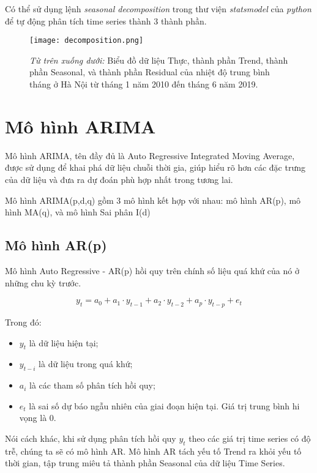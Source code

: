 \documentclass[12pt]{article}
\begin{document}
        Có thể sử dụng lệnh \textit{seasonal decomposition} trong thư viện \textit{statsmodel} của \textit{python} để tự động phân tích time series thành 3 thành phần.
        \begin{figure}[H]
            \centering
            \texttt{[image: decomposition.png]}
            \caption{\textit{Từ trên xuống dưới:} Biểu đồ dữ liệu Thực, thành phần Trend, thành phần Seasonal, và thành phần Residual của nhiệt độ trung bình tháng ở Hà Nội từ tháng 1 năm 2010 đến tháng 6 năm 2019.}
        \end{figure}

\section{Mô hình ARIMA}
Mô hình ARIMA, tên đầy đủ là Auto Regressive Integrated Moving Average, được sử dụng để khai phá dữ liệu chuỗi thời gia, giúp hiểu rõ hơn các đặc trưng của dữ liệu và đưa ra dự đoán phù hợp nhất trong tương lai.

Mô hình ARIMA(p,d,q) gồm 3 mô hình kết hợp với nhau: mô hình AR(p), mô hình MA(q), và mô hình Sai phân I(d)

    \subsection{Mô hình AR(p)}
    
    Mô hình Auto Regressive - AR(p) hồi quy trên chính số liệu quá khứ của nó ở những chu kỳ trước.
    
    $$
    y_t = a_0 + a_1 \cdot y_{t-1} + a_2 \cdot y_{t-2} + a_p \cdot y_{t-p} + e_t
    $$
    
    Trong đó:
    \begin{itemize}
        \item $y_t$ là dữ liệu hiện tại;
        \item $y_{t-i}$ là dữ liệu trong quá khứ;
        \item $a_i$ là các tham số phân tích hồi quy;
        \item $e_t$ là sai số dự báo ngẫu nhiên của giai đoạn hiện tại. Giá trị trung bình hi vọng là 0.
    \end{itemize}

    Nói cách khác, khi sử dụng phân tích hồi quy $y_t$ theo các giá trị time series có độ trễ, chúng ta sẽ có mô hình AR. Mô hình AR tách yếu tố Trend ra khỏi yếu tố thời gian, tập trung miêu tả thành phần Seasonal của dữ liệu Time Series.
    
\end{document}

